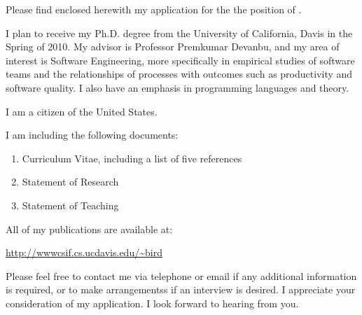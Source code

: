 \documentclass[12pt]{newlfm}
\begin{document}

\begin{newlfm} 


Please find enclosed herewith my application for the the position of
\jobposition \joblocation.

I plan to receive my Ph.D. degree from the University of California, Davis in
the Spring of 2010.  My advisor is Professor Premkumar Devanbu, and my area of
interest is Software Engineering, more specifically in empirical studies of
software teams and the relationships of processes with outcomes such as
productivity and software quality.  I also have an emphasis in programming
languages and theory.

I am a citizen of the United States.

I am including the following documents:

\begin{enumerate}
\item Curriculum Vitae, including a list of five references
\item Statement of Research
\item Statement of Teaching
\end{enumerate}

All of my publications are available at:

{\small \url{http://wwwcsif.cs.ucdavis.edu/~bird}}

Please feel free to contact me via telephone or email if any additional
information is required, or to make arrangementss if an interview is desired.
I appreciate your consideration of my application.  I look forward to hearing from
you.

\end{newlfm} 
\end{document}
